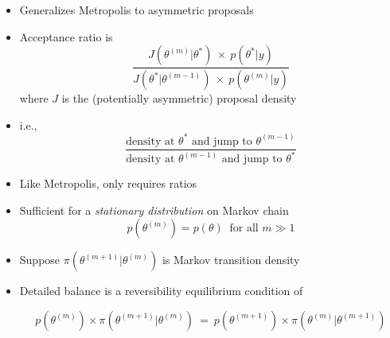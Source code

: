\documentclass[10pt]{report}
\begin{document}
%
\begin{itemize}
\item Generalizes Metropolis to asymmetric proposals
\item Acceptance ratio is
\[
\frac{J(\theta^{(m)}|\theta^{*}) \ \times \ p(\theta^{*}|y)}
     {J(\theta^{*}|\theta^{(m-1)}) \ \times \ p(\theta^{(m)}|y)}
\]
where $J$ is the (potentially asymmetric) proposal density
\item i.e.,
{\small
\[
\frac{\mbox{density at } \theta^*
      \mbox{ and jump to } \theta^{(m-1)}}
     {\mbox{density at } \theta^{(m-1)}
      \mbox{ and jump to } \theta^{*}}
\]
}
\vspace*{3pt}
\item Like Metropolis, only requires ratios
\end{itemize}


%
\begin{itemize}
\item Sufficient for a \emph{stationary distribution} on Markov chain
\[
p(\theta^{(m)}) = p(\theta) \ \mbox{ for all } m \gg 1
\]
\item Suppose $\pi(\theta^{(m+1)} | \theta^{(m)})$ is Markov transition density
\item Detailed balance is a reversibility equilibrium condition of
\[
p(\theta^{(m)}) \times \pi(\theta^{(m+1)} | \theta^{(m)})
\ = \
p(\theta^{(m+1)}) \times \pi(\theta^{(m)} | \theta^{(m+1)})
\]

\end{itemize}
\end{document}
